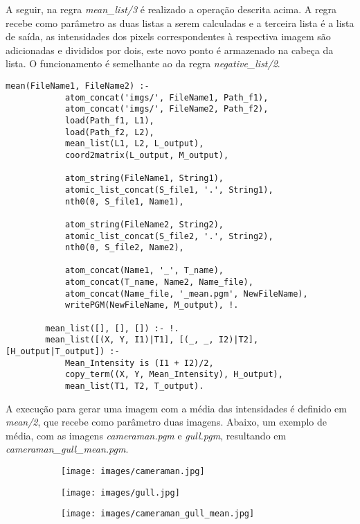 \documentclass{article}
\begin{document}
        A seguir, na regra \textit{mean\_list/3} é realizado a operação
        descrita acima. A regra recebe como parâmetro as duas listas a serem
        calculadas e a terceira lista é a lista de saída, as intensidades dos
        pixels correspondentes à respectiva imagem são adicionadas e divididos
        por dois, este novo ponto é armazenado na cabeça da lista. O
        funcionamento é semelhante ao da regra \textit{negative\_list/2}.
        
        \begin{lstlisting}[frame=single]
        mean(FileName1, FileName2) :-
            atom_concat('imgs/', FileName1, Path_f1),
            atom_concat('imgs/', FileName2, Path_f2),
            load(Path_f1, L1),
            load(Path_f2, L2),
            mean_list(L1, L2, L_output),
            coord2matrix(L_output, M_output),
        
            atom_string(FileName1, String1),
            atomic_list_concat(S_file1, '.', String1),
            nth0(0, S_file1, Name1),
        
            atom_string(FileName2, String2),
            atomic_list_concat(S_file2, '.', String2),
            nth0(0, S_file2, Name2),
        
            atom_concat(Name1, '_', T_name),
            atom_concat(T_name, Name2, Name_file),
            atom_concat(Name_file, '_mean.pgm', NewFileName),
            writePGM(NewFileName, M_output), !.
            
        mean_list([], [], []) :- !.
        mean_list([(X, Y, I1)|T1], [(_, _, I2)|T2], [H_output|T_output]) :-
            Mean_Intensity is (I1 + I2)/2,
            copy_term((X, Y, Mean_Intensity), H_output),
            mean_list(T1, T2, T_output).
        \end{lstlisting}
        
        A execução para gerar uma imagem com a média das intensidades é
        definido em \textit{mean/2}, que recebe como parâmetro duas imagens.
        Abaixo, um exemplo de média, com as imagens \textit{cameraman.pgm} e
        \textit{gull.pgm}, resultando em \textit{cameraman\_gull\_mean.pgm}.
    
        \begin{figure}[h]
        \centering
            \begin{subfigure}
            \centering
            \texttt{[image: images/cameraman.jpg]}
            \end{subfigure}
            \begin{subfigure}
            \centering
            \texttt{[image: images/gull.jpg]}
            \end{subfigure}
            \begin{subfigure}
            \centering
            \texttt{[image: images/cameraman\_gull\_mean.jpg]}
            \end{subfigure}
        \end{figure}    
        
\end{document}
